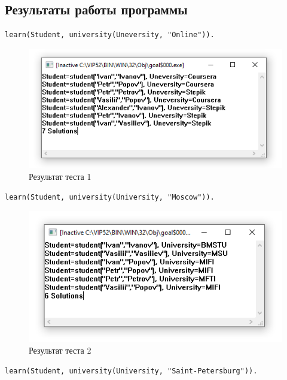 \subsection{Результаты работы программы}

\begin{lstlisting}[caption=Тест 1]
learn(Student, university(Uneversity, "Online")).
\end{lstlisting}

\begin{figure}[H]
    \centering
    \includegraphics{img/Online.png}
    \caption{Результат теста 1}
\end{figure}

\begin{lstlisting}[caption=Тест 2]
learn(Student, university(University, "Moscow")).
\end{lstlisting}

\begin{figure}[H]
    \centering
    \includegraphics{img/Moscow.png}
    \caption{Результат теста 2}
\end{figure}

\begin{lstlisting}[caption=Тест 3]
learn(Student, university(University, "Saint-Petersburg")).
\end{lstlisting}


